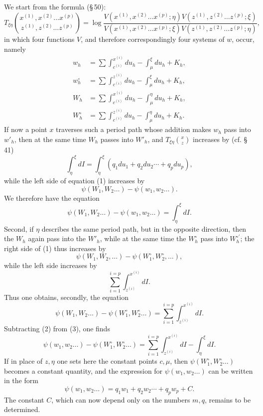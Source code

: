 \documentclass[10pt]{article}
\begin{document}
We start from the formula (\S\,50):
\[
\tag{1}T_{\xi\eta}\binom{x^{(1)},x^{(2)}\ldots x^{(p)}}{z^{(1)},z^{(2)}\ldots z^{(p)}}
=\log\frac{V(x^{(1)},x^{(2)}\ldots x^{(p)};\eta)V(z^{(1)},z^{(2)}\ldots z^{(p)};\xi)}{V(x^{(1)},x^{(2)}\ldots x^{(p)};\xi)V(z^{(1)},z^{(2)}\ldots z^{(p)};\eta)},
\]
in which four functions \(V\), and therefore correspondingly four systems of \(w\), occur, namely
\[
\begin{aligned}
w_h&=\sum\int_{c^{(i)}}^{x^{(i)}}du_h-\int_{\mu}^{\xi}du_h+K_h,\\
w_h^{\circ}&=\sum\int_{c^{(i)}}^{z^{(i)}}du_h-\int_{\mu}^{\xi}du_h+K_h,\\
W_h&=\sum\int_{c^{(i)}}^{x^{(i)}}du_h-\int_{\mu}^{\eta}du_h+K_h,\\
W_h^{\circ}&=\sum\int_{c^{(i)}}^{z^{(i)}}du_h-\int_{\mu}^{\eta}du_h+K_h.
\end{aligned}
\]
If now a point \(x\) traverses such a period path whose addition makes \(w_h\) pass into \(w'_h\), then at the same time \(W_h\) passes into \(W'_h\), and \(T_{\xi\eta}\binom{x}{z}\) increases by (cf. \S\,41)
\[
\int_{\eta}^{\xi}dI=\int_{\eta}^{\xi}(q_1du_1+q_2du_2\cdots+q_pdu_p),
\]
while the left side of equation (1) increases by
\[
\psi(W_1,W_2\ldots)-\psi(w_1,w_2\ldots).
\]
We therefore have the equation
\[
\tag{2}\psi(W_1,W_2\ldots)-\psi(w_1,w_2\ldots)=\int_{\eta}^{\xi}dI.
\]
Second, if \(\eta\) describes the same period path, but in the opposite direction, then the \(W_h\) again pass into the \(W'_h\), while at the same time the \(W_h^{\circ}\) pass into \(W_h^{\circ\prime}\); the right side of (1) thus increases by
\[
\psi(W_1,W_2,
\ldots)-\psi(W_1^{\circ},W_2^{\circ},\ldots),
\]
while the left side increases by
\[
\sum_{i=1}^{i=p}\int_{z^{(i)}}^{x^{(i)}}dI.
\]
Thus one obtains, secondly, the equation
\[
\tag{3}\psi(W_1,W_2\ldots)-\psi(W_1^{\circ},W_2^{\circ}\ldots)=\sum_{i=1}^{i=p}\int_{z^{(i)}}^{x^{(i)}}dI.
\]
Subtracting (2) from (3), one finds
\[
\psi(w_1,w_2\ldots)-\psi(W_1^{\circ},W_2^{\circ}\ldots)=\sum_{i=1}^{i=p}\int_{z^{(i)}}^{x^{(i)}}dI-\int_{\eta}^{\xi}dI.
\]
If in place of \(z,\eta\) one sets here the constant points \(c,\mu\), then \(\psi(W_1^{\circ},W_2^{\circ}\ldots)\) becomes a constant quantity, and the expression for \(\psi(w_1,w_2\ldots)\) can be written in the form
\[
\tag{4}\psi(w_1,w_2\ldots)=q_1w_1+q_2w_2\cdots+q_pw_p+C.
\]
The constant \(C\), which can now depend only on the numbers \(m,q\), remains to be determined.
\end{document}
